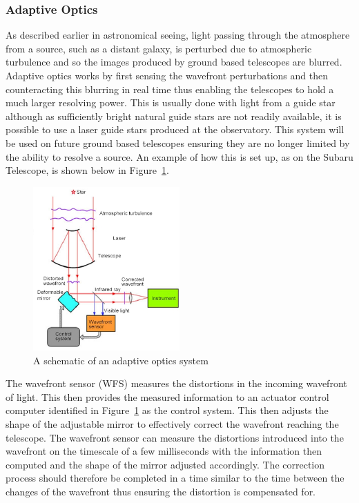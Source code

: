 		\subsubsection{Adaptive Optics} %
		\label{ssub:adaptive_optics}
			As described earlier in astronomical seeing, light passing through the atmosphere from a source, such as a distant galaxy, is perturbed due to atmospheric turbulence and so the images produced by ground based telescopes are blurred. Adaptive optics works by first sensing the wavefront perturbations and then counteracting this blurring in real time thus enabling the telescopes to hold a much larger resolving power. This is usually done with light from a guide star although as sufficiently bright natural guide stars are not readily available, it is possible to use a laser guide stars produced at the observatory. This system will be used on future ground based telescopes ensuring they are no longer limited by the ability to resolve a source. An example of how this is set up, as on the Subaru Telescope, is shown below in Figure~\ref{fig:AdaptiveOptics}.
			\begin{figure}[!htbp]
				\centering
				\includegraphics[width=0.5\textwidth]{../Images/AdaptiveOptics.png}
				\caption{A schematic of an adaptive optics system\cite{Adaptive}}\label{fig:AdaptiveOptics}
			\end{figure}

			The wavefront sensor (WFS) measures the distortions in the incoming wavefront of light. This then provides the measured information to an actuator control computer identified in Figure~\ref{fig:AdaptiveOptics} as the control system. This then adjusts the shape of the adjustable mirror to effectively correct the wavefront reaching the telescope\cite{Diffraction_Limited_Imaging_Saha}.  The wavefront sensor can measure the distortions introduced into the wavefront on the timescale of a few milliseconds with the information then computed and the shape of the mirror adjusted accordingly. The correction process should therefore be completed in a time similar to the time between the changes of the wavefront thus ensuring the distortion is compensated for.


